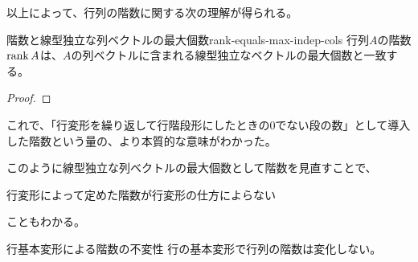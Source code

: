 \documentclass[../../../topic_linear-algebra]{subfiles}
\begin{document}
\br

以上によって、行列の階数に関する次の理解が得られる。

\begin{theorem}{階数と線型独立な列ベクトルの最大個数}{rank-equals-max-indep-cols}
  行列$A$の階数$\rank A$は、$A$の列ベクトルに含まれる線型独立なベクトルの最大個数と一致する。
\end{theorem}

\begin{proof}
\end{proof}

\br

これで、「行変形を繰り返して行階段形にしたときの0でない段の数」として導入した階数という量の、より本質的な意味がわかった。

\br

このように線型独立な列ベクトルの最大個数として階数を見直すことで、
\begin{emphabox}
  \begin{spacebox}
    \begin{center}
      行変形によって定めた階数が行変形の仕方によらない
    \end{center}
  \end{spacebox}
\end{emphabox}
こともわかる。

\begin{theorem}{行基本変形による階数の不変性}
  行の基本変形で行列の階数は変化しない。
\end{theorem}
\end{document}
